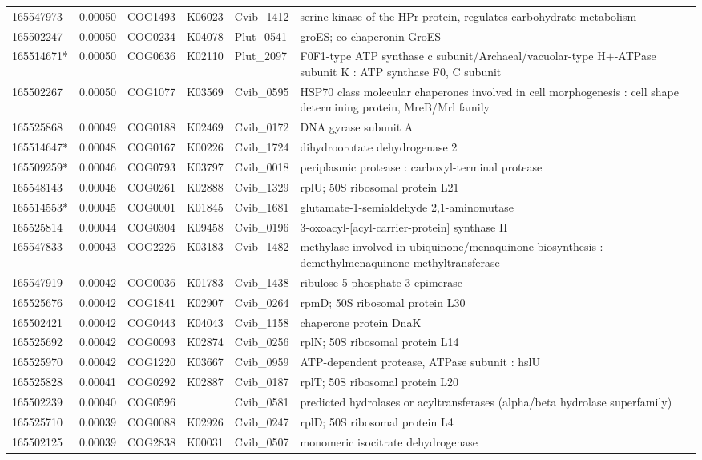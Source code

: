 \begin{landscape}
\begin{longtable}{p{1.6cm}p{1.2cm}p{1.5cm}p{1.5cm}p{2.8cm}p{13.5cm}}
165547973&0.00050&COG1493&K06023&Cvib\_1412&serine kinase of the HPr protein, regulates carbohydrate metabolism \\
165502247&0.00050&COG0234&K04078&Plut\_0541&groES; co-chaperonin GroES \\
165514671*&0.00050&COG0636&K02110&Plut\_2097&F0F1-type ATP synthase c subunit/Archaeal/vacuolar-type H$+$-ATPase subunit K : ATP synthase F0, C subunit \\
165502267&0.00050&COG1077&K03569&Cvib\_0595&HSP70 class molecular chaperones involved in cell morphogenesis : cell shape determining protein, MreB/Mrl family \\
165525868&0.00049&COG0188&K02469&Cvib\_0172&DNA gyrase subunit A \\
165514647*&0.00048&COG0167&K00226&Cvib\_1724&dihydroorotate dehydrogenase 2 \\
165509259*&0.00046&COG0793&K03797&Cvib\_0018&periplasmic protease : carboxyl-terminal protease \\
165548143&0.00046&COG0261&K02888&Cvib\_1329&rplU; 50S ribosomal protein L21 \\
165514553*&0.00045&COG0001&K01845&Cvib\_1681&glutamate-1-semialdehyde 2,1-aminomutase \\
165525814&0.00044&COG0304&K09458&Cvib\_0196&3-oxoacyl-[acyl-carrier-protein] synthase II \\
165547833&0.00043&COG2226&K03183&Cvib\_1482&methylase involved in ubiquinone/menaquinone biosynthesis : demethylmenaquinone methyltransferase \\
165547919&0.00042&COG0036&K01783&Cvib\_1438&ribulose-5-phosphate 3-epimerase \\
165525676&0.00042&COG1841&K02907&Cvib\_0264&rpmD; 50S ribosomal protein L30 \\
165502421&0.00042&COG0443&K04043&Cvib\_1158&chaperone protein DnaK \\
165525692&0.00042&COG0093&K02874&Cvib\_0256&rplN; 50S ribosomal protein L14 \\
165525970&0.00042&COG1220&K03667&Cvib\_0959&ATP-dependent protease, ATPase subunit : hslU \\
165525828&0.00041&COG0292&K02887&Cvib\_0187&rplT; 50S ribosomal protein L20 \\
165502239&0.00040&COG0596&&Cvib\_0581&predicted hydrolases or acyltransferases (alpha/beta hydrolase superfamily) \\
165525710&0.00039&COG0088&K02926&Cvib\_0247&rplD; 50S ribosomal protein L4 \\
165502125&0.00039&COG2838&K00031&Cvib\_0507&monomeric isocitrate dehydrogenase \\

\end{longtable}
\end{landscape}
